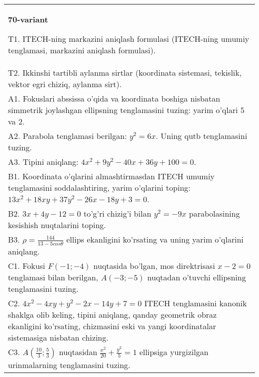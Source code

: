 \documentclass{article}
\begin{document}
\begin{tabular}{m{17cm}}
\textbf{70-variant}
\newline

T1. ITECH-ning markazini aniqlash formulasi (ITECH-ning umumiy tenglamasi, markazini aniqlash formulasi).\\

T2. Ikkinshi tartibli aylanma sirtlar (koordinata sistemasi, tekislik, vektor egri chiziq, aylanma sirt).\\

A1. Fokuslari abssissa o'qida va koordinata boshiga nisbatan simmetrik joylashgan ellipsning tenglamasini tuzing: yarim o'qlari 5 va 2.\\

A2. Parabola tenglamasi berilgan: $y^2=6x$. Uning qutb tenglamasini tuzing.\\

A3. Tipini aniqlang: $4x^2+9y^2-40x+36y+100=0$.\\

B1. Koordinata o'qlarini almashtirmasdan ITECH umumiy tenglamasini soddalashtiring, yarim o'qlarini toping: $13x^{2} + 18xy + 37y^{2} - 26x - 18y + 3 = 0$.  \\

B2. $3x + 4y - 12 = 0$ to'g'ri chizig'i bilan $y^{2} = - 9x$ parabolasining kesishish nuqtalarini toping.  \\

B3. $\rho = \frac{144}{13 - 5cos\theta}$ ellips ekanligini ko'rsating va uning yarim o'qlarini aniqlang.\\

C1. Fokusi $F( - 1; - 4)$ nuqtasida bo'lgan, mos direktrisasi $x - 2 = 0$ tenglamasi bilan berilgan, $A( - 3; - 5)$ nuqtadan o'tuvchi ellipsning tenglamasini tuzing.  \\

C2. $4x^{2} - 4xy + y^{2} - 2x - 14y + 7 = 0$ ITECH tenglamasini kanonik shaklga olib keling, tipini aniqlang, qanday geometrik obraz ekanligini ko'rsating, chizmasini eski va yangi koordinatalar sistemasiga nisbatan chizing.  \\

C3. $A(\frac{10}{3};\frac{5}{3})$ nuqtasidan $\frac{x^{2}}{20} + \frac{y^{2}}{5} = 1$ ellipsiga yurgizilgan urinmalarning tenglamasini tuzing.  \\

\end{tabular}
\vspace{1cm}
\end{document}
